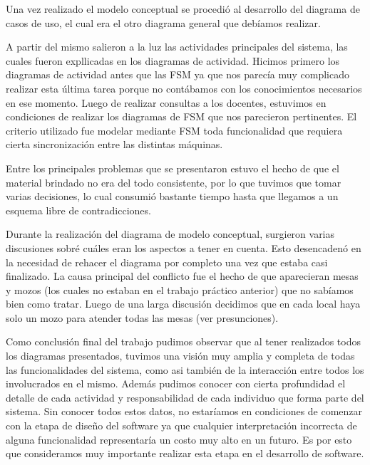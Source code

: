 \documentclass[a4paper,11pt] {article}
\begin{document}
Una vez realizado el modelo conceptual se procedi\'o al desarrollo del diagrama de casos de uso, el cual era el otro diagrama general que deb\'iamos realizar.

A partir del mismo salieron a la luz las actividades principales del sistema, las cuales fueron expllicadas en los diagramas de actividad. Hicimos primero los diagramas de actividad antes que las FSM ya que nos parec\'ia muy complicado realizar esta \'ultima tarea porque no cont\'abamos con los conocimientos necesarios en ese momento. Luego de realizar consultas a los docentes, estuvimos en condiciones de realizar los diagramas de FSM que nos parecieron pertinentes. El criterio utilizado fue modelar mediante FSM toda funcionalidad que requiera cierta sincronizaci\'on entre las distintas m\'aquinas.

Entre los principales problemas que se presentaron estuvo el hecho de que el material brindado no era del todo consistente, por lo que tuvimos que tomar varias decisiones, lo cual consumi\'o bastante tiempo hasta que llegamos a un esquema libre de contradicciones. 

Durante la realizaci\'on del diagrama de modelo conceptual, surgieron varias discusiones sobr\'e cu\'ales eran los aspectos a tener en cuenta. Esto desencaden\'o en la necesidad de rehacer el diagrama por completo una vez que estaba casi finalizado. La causa principal del conflicto fue el hecho de que aparecieran mesas y mozos (los cuales no estaban en el trabajo pr\'actico anterior) que no sab\'iamos bien como tratar. Luego de una larga discusi\'on decidimos que en cada local haya solo un mozo para atender todas las mesas (ver presunciones).

Como conclusi\'on final del trabajo pudimos observar que al tener realizados todos los diagramas presentados, tuvimos una visi\'on muy amplia y completa de todas las funcionalidades del sistema, como asi tambi\'en de la interacci\'on entre todos los involucrados en el mismo. Adem\'as pudimos conocer con cierta profundidad el detalle de cada actividad y responsabilidad de cada individuo que forma parte del sistema. Sin conocer todos estos datos, no estar\'iamos en condiciones de comenzar con la etapa de dise\~{n}o del software ya que cualquier interpretaci\'on incorrecta de alguna funcionalidad representar\'ia un costo muy alto en un futuro. Es por esto que consideramos muy importante realizar esta etapa en el desarrollo de software.
\end{document}
